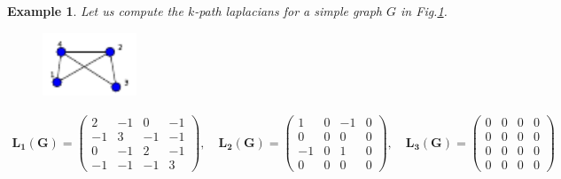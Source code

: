 \documentclass[10pt,a4paper]{article}
\newtheorem{exa}{Example}
\begin{document}
    	    \begin{exa}
    	    	Let us compute the $k$-path laplacians for a simple graph $G$ in Fig.\ref{spanning}.
    	    	
    	    	\begin{figure}[H]
    	    		\centering
    	    		\includegraphics[width=0.25\textwidth]{images/compute-spanning.pdf}
    	    		\label{spanning}
    	    	\end{figure}
    	    	
    	    	\begin{eqnarray*}
    	    		\mathbf{L_1(G)} = \begin{pmatrix}
    	    			2 & -1 & 0 & -1 \\
    	    			-1 & 3 & -1 & -1 \\
    	    			0 & -1 & 2 & -1  \\
    	    			-1 & -1 & -1 & 3
    	    		\end{pmatrix}, \quad
    	    		\mathbf{L_2(G)} = \begin{pmatrix}
    	    			1 & 0 & -1 & 0 \\
    	    			0 & 0 & 0 & 0 \\
    	    			-1 & 0 & 1 & 0 \\
    	    			0 & 0 & 0 & 0
    	    		\end{pmatrix}, \quad
    	    		\mathbf{L_3(G)} = \begin{pmatrix}
    	    			0 & 0 & 0 & 0 \\
    	    			0 & 0 & 0 & 0 \\
    	    			0 & 0 & 0 & 0 \\
    	    			0 & 0 & 0 & 0
    	    		\end{pmatrix}
    	    	\end{eqnarray*}\\
    	    \end{exa}
    	    
    	    
\end{document}

